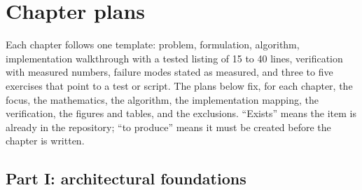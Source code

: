\section{Chapter plans}\label{sec:chapters}

Each chapter follows one template: problem, formulation, algorithm, implementation walkthrough with a tested listing of 15 to 40 lines, verification with measured numbers, failure modes stated as measured, and three to five exercises that point to a test or script. The plans below fix, for each chapter, the focus, the mathematics, the algorithm, the implementation mapping, the verification, the figures and tables, and the exclusions. ``Exists'' means the item is already in the repository; ``to produce'' means it must be created before the chapter is written.

\newcommand{\chapterplan}[4]{%
\subsection{Chapter #1: #2}\label{ch:#3}%
\textit{#4}\par\smallskip}

\subsection*{Part I: architectural foundations}

